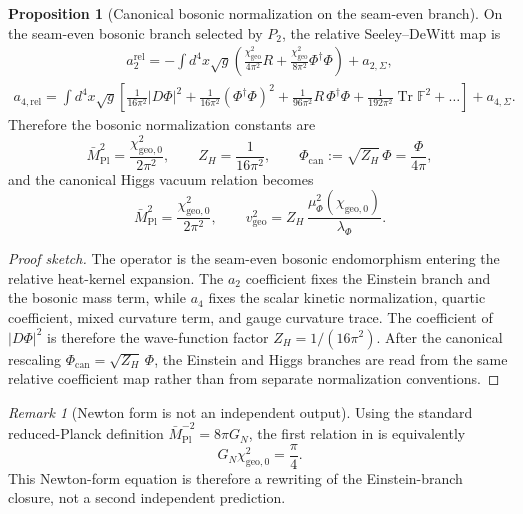\documentclass[11pt,a4paper]{article}
\theoremstyle{definition}
\newtheorem{proposition}[theorem]{Proposition}
\theoremstyle{remark}
\newtheorem*{remark}{Remark}
\DeclareMathOperator{\tr}{Tr}
\newcommand{\Seam}{\Sigma}
\newcommand{\Mpl}{\bar M_{\mathrm{Pl}}}
\newcommand{\chigeo}{\chi_{\mathrm{geo}}}
\newcommand{\chigeozero}{\chi_{\mathrm{geo},0}}
\newcommand{\vgeo}{v_{\mathrm{geo}}}
\begin{document}
\begin{proposition}[Canonical bosonic normalization on the seam-even branch]
\label{prop:canonical-bosonic-normalization}
On the seam-even bosonic branch selected by $P_2$, the relative Seeley--DeWitt map is
\begin{equation}
\label{eq:relative-a2}
\begin{aligned}
a_2^{\mathrm{rel}}
=
-\int d^4x\sqrt g
\left(
\frac{\chigeo^2}{4\pi^2}R
+
\frac{\chigeo^2}{8\pi^2}\Phi^\dagger\Phi
\right)
+
a_{2,\Seam},
\end{aligned}
\end{equation}
\begin{equation}
\label{eq:relative-a4}
\begin{aligned}
a_{4,\mathrm{rel}}
=
\int d^4x\sqrt g
\left[
\frac{1}{16\pi^2}|D\Phi|^2
+
\frac{1}{16\pi^2}(\Phi^\dagger\Phi)^2
+
\frac{1}{96\pi^2}R\,\Phi^\dagger\Phi
+
\frac{1}{192\pi^2}\tr\mathbb F^2
+\dots
\right]
+
a_{4,\Seam}.
\end{aligned}
\end{equation}
Therefore the bosonic normalization constants are
\[
\Mpl^2=\frac{\chigeozero^2}{2\pi^2},
\qquad
Z_H=\frac{1}{16\pi^2},
\qquad
\Phi_{\mathrm{can}}:=\sqrt{Z_H}\,\Phi=\frac{\Phi}{4\pi},
\]
and the canonical Higgs vacuum relation becomes
\begin{equation}
\label{eq:induced-einstein}
\Mpl^2=\frac{\chigeozero^2}{2\pi^2},
\qquad
\vgeo^2=Z_H\,\frac{\mu_\Phi^2(\chigeozero)}{\lambda_\Phi}.
\end{equation}
\end{proposition}

\begin{proof}[Proof sketch]
The operator  is the seam-even bosonic endomorphism entering the relative heat-kernel expansion. The $a_2$ coefficient fixes the Einstein branch and the bosonic mass term, while $a_4$ fixes the scalar kinetic normalization, quartic coefficient, mixed curvature term, and gauge curvature trace. The coefficient of $|D\Phi|^2$ is therefore the wave-function factor $Z_H=1/(16\pi^2)$. After the canonical rescaling $\Phi_{\mathrm{can}}=\sqrt{Z_H}\,\Phi$, the Einstein and Higgs branches are read from the same relative coefficient map rather than from separate normalization conventions.
\end{proof}

\begin{remark}[Newton form is not an independent output]
Using the standard reduced-Planck definition $\Mpl^{-2}=8\pi G_N$, the first relation in  is equivalently
\[
G_N\chigeozero^2=\frac{\pi}{4}.
\]
This Newton-form equation is therefore a rewriting of the Einstein-branch closure, not a second independent prediction.
\end{remark}
\end{document}
